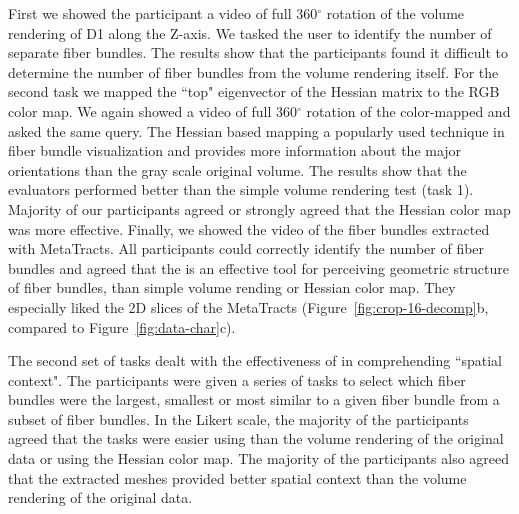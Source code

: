  
First we showed the participant a video of full 360{$^\circ$} rotation of the volume rendering of D1 along the Z-axis. We tasked the user to identify the number of separate fiber bundles. The results show that the participants found it difficult to determine the number of fiber bundles from the volume rendering itself. For the second task we mapped the ``top" eigenvector of the Hessian matrix to the RGB color map. We again showed a video of full 360{$^\circ$} rotation of the color-mapped and asked the same query. The Hessian based mapping a popularly used technique in fiber bundle visualization and provides more information about the major orientations than the  gray scale original volume. The results show that the evaluators performed better than the simple volume rendering test (task 1). Majority of our participants agreed or strongly agreed that the Hessian color map was more effective. Finally, we showed the video of the fiber bundles extracted with MetaTracts. 
All participants could correctly identify the number of fiber bundles and agreed that the \mt  is an effective tool for perceiving geometric structure  of fiber bundles, than simple volume rending or Hessian color map. They especially liked the 2D slices of the MetaTracts (Figure~\ref{fig:crop-16-decomp}b, compared to Figure~\ref{fig:data-char}c).

The second set of tasks dealt with the effectiveness of \mt in comprehending ``spatial context". The participants were given a series of tasks to select which fiber bundles were the largest, smallest or most similar to a given fiber bundle from a subset of fiber bundles. In the Likert scale, the majority of the participants agreed that the tasks were easier using \mt than the volume rendering of the original data or using the Hessian color map. 
The majority of the participants also agreed that the extracted meshes provided better spatial context than the volume rendering of the original data. 
